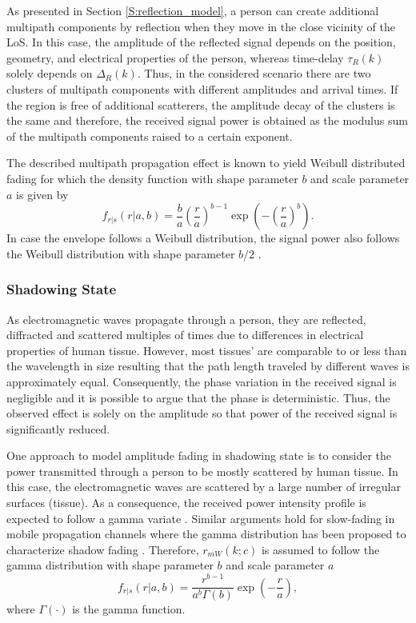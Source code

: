 \documentclass[journal, 10pt, twocolumn, balance]{IEEEtran}
\begin{document}
As presented in Section \ref{S:reflection_model}, a person can create additional multipath components by reflection when they move in the close vicinity of the LoS. In this case, the amplitude of the reflected signal depends on the position, geometry, and electrical properties of the person, whereas time-delay $\tau_R(k)$ solely depends on $\Delta_R(k)$. Thus, in the considered scenario there are two clusters of multipath components with different amplitudes and arrival times. If the region is free of additional scatterers, the amplitude decay of the clusters is the same and therefore, the received signal power is obtained as the modulus sum of the multipath components raised to a certain exponent.


The described multipath propagation effect is known to yield Weibull distributed fading  \cite{Yacoub2002, Sagias2005} for which the density function with shape parameter $b$ and scale parameter $a$ is given by
\begin{equation}\label{eq:reflection_distribution}
f_{r \vert s}\left(r \vert a, b \right) = \frac{b}{a}\left( \frac{r}{a}\right)^{b-1}\exp \left(-\left( \frac{r}{a}\right)^b\right).
\end{equation}
In case the envelope follows a Weibull distribution, the signal power also follows the Weibull distribution with shape parameter $b/2$ \cite[p. 26]{Simon2005}. 


\subsubsection{Shadowing State}

As electromagnetic waves propagate through a person, they are reflected, diffracted and scattered multiples of times due to differences in electrical properties of human tissue. However, most tissues' are comparable to or less than the wavelength in size resulting that the path length traveled by different waves is approximately equal. Consequently, the phase variation in the received signal is negligible and it is possible to argue that the phase is deterministic. Thus, the observed effect is solely on the amplitude so that power of the received signal is significantly reduced.
 
One approach to model amplitude fading in shadowing state is to consider the power transmitted through a person to be mostly scattered by human tissue. In this case, the electromagnetic waves are scattered by a large number of irregular surfaces (tissue). As a consequence, the received power intensity profile is expected to follow a gamma variate \cite{Jakeman1982}. Similar arguments hold for slow-fading in mobile propagation channels where the gamma distribution has been proposed to characterize shadow fading \cite{Abdi1999}. Therefore, $r_{mW}(k;c)$ is assumed to follow the gamma distribution with shape parameter $b$ and scale parameter $a$
\begin{equation} \label{eq:fading_distribution}
     f_{r \vert s}\left(r \vert a, b\right) = \frac{r^{b-1}}{a^b\Gamma(b)}\exp \left(-\frac{r}{a}\right), 
\end{equation}
where $\Gamma(\cdot)$ is the gamma function.
\end{document}
